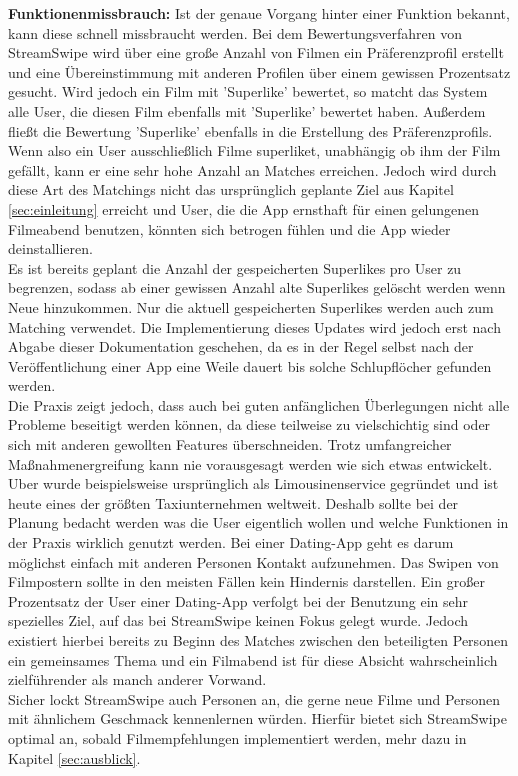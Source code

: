 \noindent
{}
\textbf{Funktionenmissbrauch:} Ist der genaue Vorgang hinter einer Funktion bekannt, kann diese schnell missbraucht werden. Bei dem Bewertungsverfahren von StreamSwipe wird über eine große Anzahl von Filmen ein Präferenzprofil erstellt und eine Übereinstimmung mit anderen Profilen über einem gewissen Prozentsatz gesucht. Wird jedoch ein Film mit 'Superlike' bewertet, so matcht das System alle User, die diesen Film ebenfalls mit 'Superlike' bewertet haben. Außerdem fließt die Bewertung 'Superlike' ebenfalls in die Erstellung des Präferenzprofils. Wenn also ein User ausschließlich Filme superliket, unabhängig ob ihm der Film gefällt, kann er eine sehr hohe Anzahl an Matches erreichen. Jedoch wird durch diese Art des Matchings nicht das ursprünglich geplante Ziel aus Kapitel \ref{sec:einleitung} erreicht und User, die die App ernsthaft für einen gelungenen Filmeabend benutzen, könnten sich betrogen fühlen und die App wieder deinstallieren.\\
Es ist bereits geplant die Anzahl der gespeicherten Superlikes pro User zu begrenzen, sodass ab einer gewissen Anzahl alte Superlikes gelöscht werden wenn Neue hinzukommen.  Nur die aktuell gespeicherten Superlikes werden auch zum Matching verwendet. Die Implementierung dieses Updates wird jedoch erst nach Abgabe dieser Dokumentation geschehen, da es in der Regel selbst nach der Veröffentlichung einer App eine Weile dauert bis solche Schlupflöcher gefunden werden.\\

\noindent
Die Praxis zeigt jedoch, dass auch bei guten anfänglichen Überlegungen nicht alle Probleme beseitigt werden können, da diese teilweise zu vielschichtig sind oder sich mit anderen gewollten Features überschneiden. Trotz umfangreicher Maßnahmenergreifung kann nie vorausgesagt werden wie sich etwas entwickelt. Uber wurde beispielsweise ursprünglich als Limousinenservice gegründet und ist heute eines der größten Taxiunternehmen weltweit. Deshalb sollte bei der Planung bedacht werden was die User eigentlich wollen und welche Funktionen in der Praxis wirklich genutzt werden. Bei einer Dating-App geht es darum möglichst einfach mit anderen Personen Kontakt aufzunehmen.  Das Swipen von Filmpostern sollte in den meisten Fällen kein Hindernis darstellen. Ein großer Prozentsatz der User einer Dating-App verfolgt bei der Benutzung ein sehr spezielles Ziel, auf das bei StreamSwipe keinen Fokus gelegt wurde. Jedoch existiert hierbei bereits zu Beginn des Matches zwischen den beteiligten Personen ein gemeinsames Thema und ein Filmabend ist für diese Absicht wahrscheinlich zielführender als manch anderer Vorwand. \\
Sicher lockt StreamSwipe auch Personen an, die gerne  neue Filme und Personen mit ähnlichem Geschmack kennenlernen würden. Hierfür bietet sich StreamSwipe optimal an, sobald Filmempfehlungen implementiert werden, mehr dazu in Kapitel \ref{sec:ausblick}.\\

